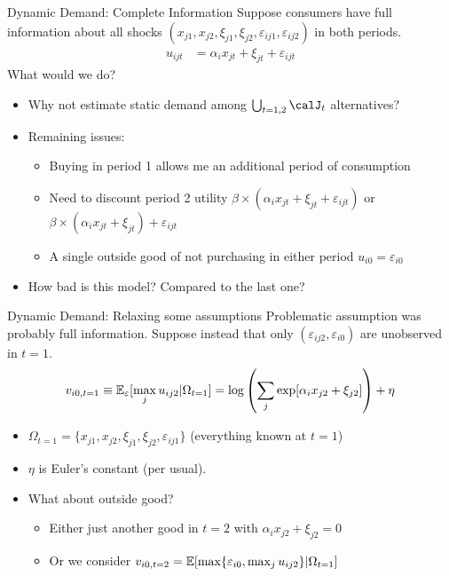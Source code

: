 \begin{frame}{Dynamic Demand: Complete Information}
Suppose consumers have full information about all shocks $(x_{j1},x_{j2},\xi_{j1},\xi_{j2},\varepsilon_{ij1},\varepsilon_{ij2})$ in both periods. 
\begin{align*}
u_{ijt} &=   \alpha_i x_{jt}  +  \xi_{jt} + \varepsilon_{ijt}
\end{align*}
What would we do?
\begin{itemize}
\item Why not estimate static demand among $\bigcup_{t=1,2}  \calJ_t $ alternatives?
\item Remaining issues:
\begin{itemize}
\item Buying in period 1 allows me an additional period of consumption
\item Need to discount period 2 utility $\beta \times ( \alpha_i x_{jt}  +  \xi_{jt} + \varepsilon_{ijt})$ or $\beta \times ( \alpha_i x_{jt}  +  \xi_{jt} )+\varepsilon_{ijt}$
\item A single outside good of not purchasing in either period $ u_{i0} =  \varepsilon_{i0} $
\end{itemize}
\item How bad is this model? Compared to the last one?
\end{itemize}
\end{frame}



\begin{frame}{Dynamic Demand: Relaxing some assumptions}
Problematic assumption was probably full information. Suppose instead that only $(\varepsilon_{ij2},\varepsilon_{i0})$ are \alert{unobserved} in $t=1$. 
\begin{align*}
v_{i0,t=1} \equiv \mathbb{E}_{\varepsilon} [\max_j u_{ij2} | \Omega_{t=1} ] = \log \left( \sum_j \exp [ \alpha_i x_{j2}  +  \xi_{j2} ] \right) + \eta
\end{align*}
\begin{itemize}
\item $\Omega_{t=1}= \{x_{j1},x_{j2},\xi_{j1},\xi_{j2},\varepsilon_{ij1}\}$ (everything known at $t=1$) 
\item $\eta$ is Euler's constant (per usual).
\item What about outside good?
\begin{itemize}
\item Either just another good in $t=2$ with $\alpha_i x_{j2}+ \xi_{j2} = 0$
\item Or we consider $v_{i0,t=2}=\mathbb{E} [\max \{ \varepsilon_{i0}, \max_j u_{ij2} \}  | \Omega_{t=1}]$
\end{itemize}
\end{itemize}
\end{frame}

